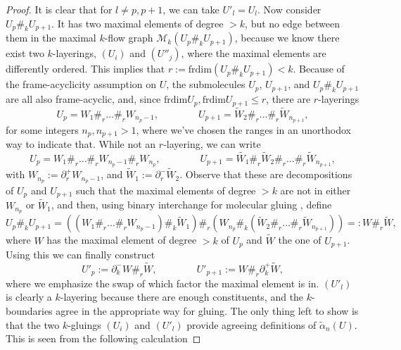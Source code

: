 \documentclass[12pt,a4paper]{article}
\numberwithin{equation}{section}
\begin{document}
\begin{proof}
    It is clear that for $l \neq p, p+1$, we can take $U'_l = U_l$. Now consider $U_p \#_k U_{p+1}$. It has two maximal elements of degree $>k$, but no edge between them in the maximal $k$-flow graph $\mathscr{M}_k (U_p \#_k U_{p+1})$, because we know there exist two $k$-layerings, $(U_i)$ and $(U''_j)$, where the maximal elements are differently ordered. This implies that $r:= \mathrm{frdim} (U_p \#_k U_{p+1}) < k$. Because of the frame-acyclicity assumption on $U$, the submolecules $U_p$, $U_{p+1}$, and $U_p \#_k U_{p+1}$ are all also frame-acyclic, and, since $\mathrm{frdim} U_p, \mathrm{frdim} U_{p+1} \leq r$, there are $r$-layerings
    \begin{equation}
        U_p = W_1 \#_r \dots \#_r W_{n_p - 1}, \qquad \qquad U_{p+1} = \tilde{W}_2 \#_r \dots \#_r \tilde{W}_{n_{p+1}},
    \end{equation}
    for some integers $n_p, n_{p+1} > 1$, where we've chosen the ranges in an unorthodox way to indicate that. While not an $r$-layering, we can write
    \begin{equation}
        U_p = W_1 \#_r \dots \#_r W_{n_p - 1} \#_r W_{n_p}, \qquad \qquad U_{p+1} = \tilde{W_1} \#_r \tilde{W}_2 \#_r \dots \#_r \tilde{W}_{n_{p+1}},
    \end{equation}
    with $W_{n_p} := \partial_r^+ W_{n_p - 1}$, and $\tilde{W}_1 := \partial_r^- \tilde{W}_2$. Observe that these are decompositions of $U_p$ and $U_{p+1}$ such that the maximal elements of degree $> k$ are not in either $W_{n_p}$ or $\tilde{W}_1$, and then, using binary interchange for molecular gluing \cite[Prop.\,3.4.22]{hadzihasanovic}, define
    \begin{equation}
        U_p \#_k U_{p+1} = \left( (W_1 \#_r \dots \#_r W_{n_p - 1}) \#_k \tilde{W}_1 \right) \#_r \left( W_{n_p} \#_k (\tilde{W}_2 \#_r \dots \#_r \tilde{W}_{n_{p+1}}) \right) = : W \#_r \tilde{W},
    \end{equation}
    where $W$ has the maximal element of degree $>k$ of $U_p$ and $\tilde{W}$ the one of $U_{p+1}$. Using this we can finally construct
    \begin{equation}
        U'_p := \partial_k^- W \#_r \tilde{W}, \qquad \qquad U'_{p+1} := W \#_r \partial_k^+ \tilde{W},
    \end{equation}
    where we emphasize the swap of which factor the maximal element is in. $(U'_l)$ is clearly a $k$-layering because there are enough constituents, and the $k$-boundaries agree in the appropriate way for gluing. The only thing left to show is that the two $k$-gluings $(U_i)$ and $(U'_l)$ provide agreeing definitions of $\tilde{\alpha}_n(U)$. This is seen from the following calculation

\end{proof}
\end{document}
